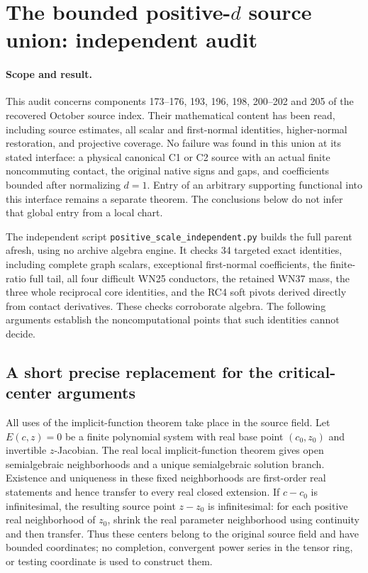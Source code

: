 \section{The bounded positive-$d$ source union: independent audit}
\label{sec:positive-scale-independent-audit}

\paragraph{Scope and result.}
This audit concerns components 173--176, 193, 196, 198, 200--202 and
205 of the recovered October source index.  Their mathematical content
has been read, including source estimates, all scalar and first-normal
identities, higher-normal restoration, and projective coverage.  No
failure was found in this union at its stated interface: a physical
canonical C1 or C2 source with an actual finite noncommuting contact,
the original native signs and gaps, and coefficients bounded after
normalizing $d=1$.  Entry of an arbitrary supporting functional into
this interface remains a separate theorem.  The conclusions below do
not infer that global entry from a local chart.

The independent script \texttt{positive\_scale\_independent.py} builds
the full parent afresh, using no archive algebra engine.  It checks
34 targeted exact identities, including complete graph scalars,
exceptional first-normal coefficients, the finite-ratio full tail,
all four difficult WN25 conductors, the retained WN37 mass, the three
whole reciprocal core identities, and the RC4 soft pivots derived
directly from contact derivatives.  These checks corroborate algebra.
The following arguments establish the noncomputational points that
such identities cannot decide.

\subsection{A short precise replacement for the critical-center arguments}

All uses of the implicit-function theorem take place in the source
field.  Let $E(c,z)=0$ be a finite polynomial system with real base
point $(c_0,z_0)$ and invertible $z$-Jacobian.  The real local
implicit-function theorem gives open semialgebraic neighborhoods and
a unique semialgebraic solution branch.  Existence and uniqueness in
these fixed neighborhoods are first-order real statements and hence
transfer to every real closed extension.  If $c-c_0$ is infinitesimal,
the resulting source point $z-z_0$ is infinitesimal: for each positive
real neighborhood of $z_0$, shrink the real parameter neighborhood
using continuity and then transfer.  Thus these centers belong to
the original source field and have bounded coordinates; no completion,
convergent power series in the tensor ring, or testing coordinate is
used to construct them.

